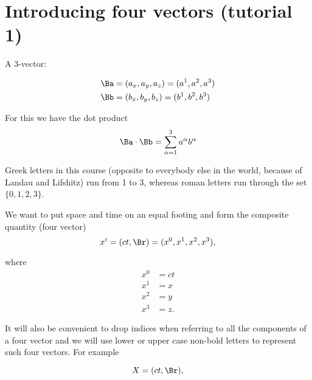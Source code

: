 %
%
\section{Introducing four vectors (tutorial 1)}

A 3-vector: 

\begin{equation}\label{eqn:relativisticElectrodynamicsT1:10}
\begin{aligned}
\Ba &= (a_x, a_y, a_z) = (a^1, a^2, a^3) \\
\Bb &= (b_x, b_y, b_z) = (b^1, b^2, b^3)
\end{aligned}
\end{equation}

For this we have the dot product
\begin{equation}\label{eqn:relativisticElectrodynamicsT1:20}
\Ba \cdot \Bb = \sum_{\alpha=1}^3 a^\alpha b^\alpha
\end{equation}

Greek letters in this course (opposite to everybody else in the world, because of Landau and Lifshitz) run from 1 to 3, whereas roman letters run through the set $\{0,1,2,3\}$.

We want to put space and time on an equal footing and form the composite quantity (four vector) 
\begin{equation}\label{eqn:relativisticElectrodynamicsT1:40}
x^i = (ct, \Br) = (x^0, x^1, x^2, x^3),
\end{equation}

where
\begin{equation}\label{eqn:relativisticElectrodynamicsT1:80}
\begin{aligned}
x^0 &= ct \\
x^1 &= x \\
x^2 &= y \\
x^3 &= z.
\end{aligned}
\end{equation}

It will also be convenient to drop indices when referring to all the components of a four vector and we will use lower or upper case non-bold letters to represent such four vectors.  For example

\begin{equation}\label{eqn:relativisticElectrodynamicsT1:81}
X = (ct, \Br),
\end{equation}

